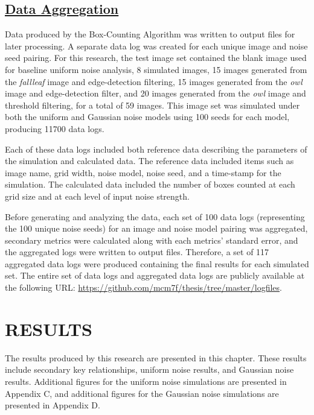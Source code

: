 \documentclass[12pt, oneside]{book}
\begin{document}
\section{\underline{Data Aggregation}}
Data produced by the Box-Counting Algorithm was written to output files for later processing.  A separate data log was created for each unique image and noise seed pairing.  For this research, the test image set contained the blank image used for baseline uniform noise analysis, 8 simulated images, 15 images generated from the \textit{fallleaf} image and edge-detection filtering, 15 images generated from the \textit{owl} image and edge-detection filter, and 20 images generated from the \textit{owl} image and threshold filtering, for a total of 59 images. This image set was simulated under both the uniform and Gaussian noise models using 100 seeds for each model, producing 11700 data logs.

Each of these data logs included both reference data describing the parameters of the simulation and calculated data.  The reference data included items such as image name, grid width, noise model, noise seed, and a time-stamp for the simulation.  The calculated data included the number of boxes counted at each grid size and at each level of input noise strength.  

Before generating and analyzing the data, each set of 100 data logs (representing the 100 unique noise seeds) for an image and noise model pairing was aggregated, secondary metrics were calculated along with each metrics' standard error, and the aggregated logs were written to output files.  Therefore, a set of 117 aggregated data logs were produced containing the final results for each simulated set.  The entire set of data logs and aggregated data logs are publicly available at the following URL: \url{https://github.com/mcm7f/thesis/tree/master/logfiles}.

% 
%
\chapter{\textbf{RESULTS}}
The results produced by this research are presented in this chapter.  These results include secondary key relationships, uniform noise results, and Gaussian noise results. Additional figures for the uniform noise simulations are presented in Appendix C, and additional figures for the Gaussian noise simulations are presented in Appendix D.
\end{document}
